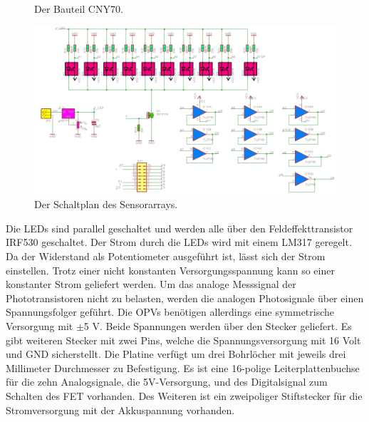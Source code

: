 \documentclass[a4paper,bibtotoc,oneside]{scrbook}
\begin{document}
\begin{figure}
\centering
\caption{Der Bauteil CNY70.} \label{cny}
\end{figure} 

\begin{figure}[htbp]
\centering
\includegraphics[width=125mm]{img/array.png}
\caption{Der Schaltplan des Sensorarrays.}\label{array}
\end{figure}

Die LEDs sind parallel geschaltet und werden alle über den Feldeffekttransistor IRF530 \cite{irf} geschaltet.
Der Strom durch die LEDs wird mit einem LM317 geregelt. Da der Widerstand als Potentiometer ausgeführt ist, lässt sich der Strom einstellen. Trotz einer nicht konstanten Versorgungsspannung kann so einer konstanter Strom geliefert werden. Um das analoge Messsignal der Phototransistoren nicht zu belasten, werden die analogen Photosignale über einen Spannungsfolger geführt. Die OPVs benötigen allerdings eine symmetrische Versorgung mit $\pm$5 V. Beide Spannungen werden über den Stecker geliefert.
Es gibt weiteren Stecker mit zwei Pins, welche die Spannungsversorgung mit 16 Volt und GND sicherstellt. 
Die Platine verfügt um drei Bohrlöcher mit jeweils drei Millimeter Durchmesser zu Befestigung.
Es ist eine 16-polige Leiterplattenbuchse für die zehn Analogsignale, die 5V-Versorgung, und des Digitalsignal zum Schalten des FET vorhanden. Des Weiteren ist ein zweipoliger Stiftstecker für die Stromversorgung mit der Akkuspannung vorhanden.
\end{document}

